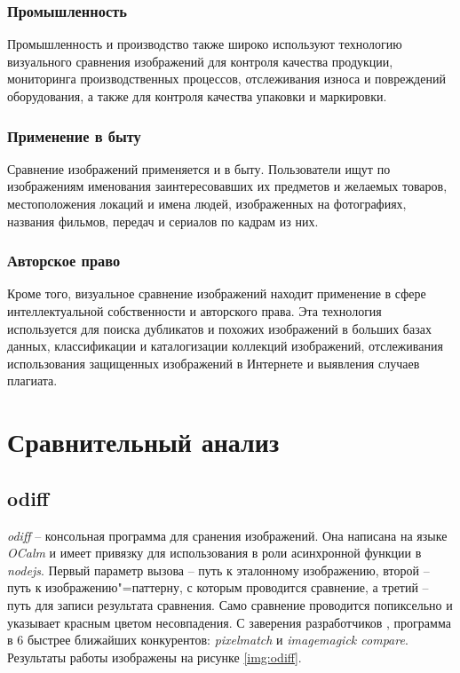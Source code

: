 \documentclass[variant=courcework]{bsuir}
\begin{document}
\subsubsection{Промышленность}
Промышленность и производство также широко используют технологию визуального
сравнения изображений для контроля качества продукции, мониторинга
производственных процессов, отслеживания износа и повреждений оборудования, а
также для контроля качества упаковки и маркировки.

\subsubsection{Применение в быту}
Сравнение изображений применяется и в быту. Пользователи ищут по изображениям
именования заинтересовавших их предметов и желаемых товаров, местоположения
локаций и имена людей, изображенных на фотографиях, названия фильмов, передач и
сериалов по кадрам из них.

\subsubsection{Авторское право}
Кроме того, визуальное сравнение изображений находит применение в сфере
интеллектуальной собственности и авторского права. Эта технология используется
для поиска дубликатов и похожих изображений в больших базах данных,
классификации и каталогизации коллекций изображений, отслеживания использования
защищенных изображений в Интернете и выявления случаев плагиата.

\section{Сравнительный анализ}

\subsection{odiff}

\textit{odiff} -- консольная программа для сранения изображений. Она написана на
языке \textit{OCalm} и имеет привязку для использования в роли асинхронной
функции в \textit{nodejs}. Первый параметр вызова -- путь к эталонному
изображению, второй -- путь к изображению"=паттерну, с которым проводится
сравнение, а третий -- путь для записи результата сравнения. Само сравнение
проводится попиксельно и указывает красным цветом несовпадения. С заверения
разработчиков \cite{benchmarks-odiff}, программа в 6 быстрее ближайших
конкурентов: \textit{pixelmatch} и \textit{imagemagick compare}. Результаты
работы изображены на рисунке \ref{img:odiff}.
\end{document}
